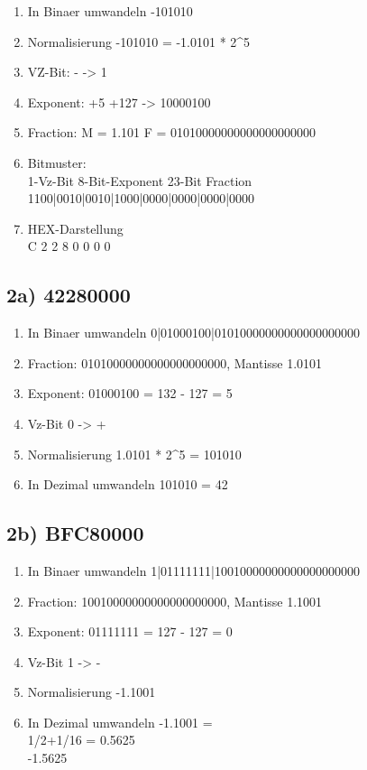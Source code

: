 \documentclass[]{article}
\providecommand{\tightlist}{%
  \setlength{\itemsep}{0pt}\setlength{\parskip}{0pt}}
\begin{document}
\begin{enumerate}
\tightlist
\item
  In Binaer umwandeln -101010
\item
  Normalisierung -101010 = -1.0101 * 2\^{}5
\item
  VZ-Bit: - -> 1
\item
  Exponent: +5 +127 -> 10000100
\item
  Fraction: M = 1.101 F = 01010000000000000000000
\item
  Bitmuster:\\
  1-Vz-Bit 8-Bit-Exponent 23-Bit Fraction\\
  1100|0010|0010|1000|0000|0000|0000|0000
\item
  HEX-Darstellung\\
  C 2 2 8 0 0 0 0
\end{enumerate}

\pagebreak

\subsection{2a) 42280000}\label{a-42280000}

\begin{enumerate}
\tightlist
\item
  In Binaer umwandeln
  0|01000100|01010000000000000000000
\item
  Fraction: 01010000000000000000000, Mantisse 1.0101
\item
  Exponent: 01000100 = 132 - 127 = 5
\item
  Vz-Bit 0 -> +
\item
  Normalisierung 1.0101 * 2\^{}5 = 101010
\item
  In Dezimal umwandeln 101010 = 42
\end{enumerate}

\subsection{2b) BFC80000}\label{b-bfc80000}

\begin{enumerate}
\tightlist
\item
  In Binaer umwandeln
  1|01111111|10010000000000000000000
\item
  Fraction: 10010000000000000000000, Mantisse 1.1001
\item
  Exponent: 01111111 = 127 - 127 = 0
\item
  Vz-Bit 1 -> -
\item
  Normalisierung -1.1001
\item
  In Dezimal umwandeln -1.1001 =\\
  1/2+1/16 = 0.5625\\
  -1.5625
\end{enumerate}
\end{document}
